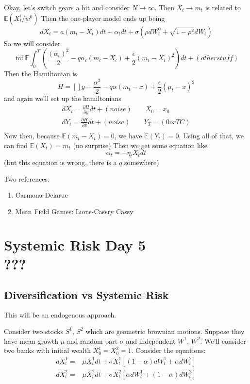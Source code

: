 Okay, let's switch gears a bit and consider $N\to\infty$. Then $\bar{X}_t \to m_t$ is related to $\mathbb{E}(X^i_t/w^0)$
Then the one-player model ends up being
\begin{equation}
	dX_t = a (m_t - X_t)dt + \alpha_t dt + \sigma(\rho dW_t^0 + \sqrt{1-\rho^2}dW_t)
\end{equation}
So we will consider
\begin{equation}
	\inf \mathbb{E} \int_0^T \left( \frac{(\alpha_t)^2}{2} - q\alpha_t (m_t - X_t) + \frac{\epsilon}{2}(m_t - X_t)^2\right)dt + (other stuff)
\end{equation}
Then the Hamiltonian is
\begin{equation}
	H = \left[ \right] y + \frac{\alpha^2}{2} - q\alpha(m_t - x) + \frac{\epsilon}{2}(\mu_t-x)^2
\end{equation}
and again we'll set up the hamiltonians
\begin{align}
	dX_t = \frac{\partial H}{\partial y} dt + (noise)\qquad X_0=x_0\\
	dY_t = \frac{\partial H}{\partial x} dt + (noise)\qquad Y_T=(0 or TC)\\
\end{align}
Now then, because $\mathbb{E}(m_t - X_t)=0$, we have $\mathbb{E}(Y_t)=0$.
Using all of that, we can find $\mathbb{E}(X_t)= m_t $ (no surprise)
Then we get some equation like
\begin{equation}
	\alpha_t = - \eta_t X_t dt
\end{equation}
(but this equation is wrong, there is a $q$ somewhere)

Two references:
\begin{enumerate}
	\item Carmona-Delarue
	\item Mean Field Games: Lions-Cassry Cassy
\end{enumerate}

\chapter{Systemic Risk Day 5 \\ ???}

\section{Diversification vs Systemic Risk}
This will be an endogenous approach.

Consider two stocks $S^1$, $S^2$ which are geometric brownian motions.
Suppose they have mean growth $\mu$ and random part $\sigma$ and independent $W^1$, $W^2$.
We'll consider two banks with initial wealth $X^1_0=X^2_0=1$.
Consider the equations:
\begin{align}
	dX^1_t =& \mu X_t^1 dt + \sigma X_t^1 \left[(1-\alpha) dW^1_t  + \alpha dW^2_t \right]\\
	dX^2_t =& \mu X_t^2 dt + \sigma X_t^2 \left[\alpha dW^1_t  + (1-\alpha) dW^2_t \right]
\end{align}

